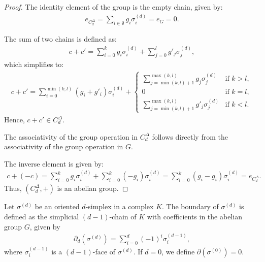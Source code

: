 \begin{proof}
	The identity element of the group is the empty chain, given by:
	\begin{align}
		e_{C^{\Delta}_d} = \sum_{i \in \emptyset} g_{i} \sigma_{i}^{(d)} = e_{G} = 0. 
	\end{align}
				
	The sum of two chains is defined as:
	\begin{align}
		c + c' = \sum_{i=0}^{k} g_{i} \sigma_{i}^{(d)} + \sum_{j=0}^{l} g'_{j} \sigma_{j}^{(d)}, 
	\end{align}
	which simplifies to:
	\begin{align}
		c + c' = \sum_{i=0}^{\min(k, l)} (g_{i} + g'_{i}) \sigma_{i}^{(d)} + 
		\begin{cases}
		\sum_{j=\min(k, l)+1}^{\max(k, l)} g_{j} \sigma_{j}^{(d)}  & \text{if } k > l, \\
		0                                                          & \text{if } k = l, \\
		\sum_{j=\min(k, l)+1}^{\max(k, l)} g'_{j} \sigma_{j}^{(d)} & \text{if } k < l. 
		\end{cases}
	\end{align}
	Hence, \( c + c' \in C^{\Delta}_{d} \).
				
	The associativity of the group operation in \( C^{\Delta}_{d} \) follows directly from
	the associativity of the group operation in \( G \).
				
	The inverse element is given by:
	\begin{align}
		c + (-c) = \sum_{i=0}^{k} g_{i} \sigma_{i}^{(d)} + \sum_{i=0}^{k} (-g_{i}) \sigma_{i}^{(d)} = \sum_{i=0}^{k} (g_{i} - g_{i}) \sigma_{i}^{(d)} = e_{C^{\Delta}_d}. 
	\end{align}
	Thus, \( (C^{\Delta}_{d}, +) \) is an abelian group.
\end{proof}

\begin{definition}[Boundary]{\cite[\S 2, p. 106]{hatcher2005algebraic}} 
	Let \( \sigma^{(d)} \) be an oriented \( d \)-simplex in a complex \( K \). The boundary of \( \sigma^{(d)} \) is defined as the simplicial \( (d-1) \)-chain of \( K \) with coefficients in the abelian group \( G \), given by
	\begin{align}
		\partial_d(\sigma^{(d)}) = \sum_{i=0}^{d} (-1)^{i} \sigma^{(d-1)}_{i}, 
	\end{align}
	where \( \sigma^{(d-1)}_{i} \) is a \( (d-1) \)-face of \( \sigma^{(d)} \). If \( d = 0 \), we define \( \partial(\sigma^{(0)}) = 0 \).
\end{definition}

